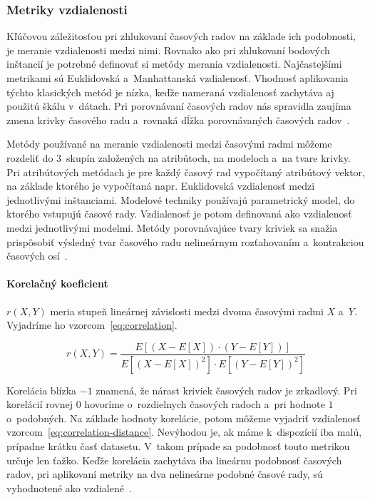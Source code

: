 \documentclass[a4paper,twoside,slovak,12pt,appendix]{article}
\begin{document}
\subsubsection{Metriky vzdialenosti}
\label{c:distance-metrics}
Kľúčovou záležitosťou pri zhlukovaní časových radov na základe ich podobnosti,
je meranie vzdialenosti medzi nimi. Rovnako ako pri zhlukovaní bodových
inštancií je potrebné definovať si metódy merania vzdialenosti. Najčastejšími
metrikami sú Euklidovská a~Manhattanská vzdialenosť. Vhodnosť aplikovania
týchto klasických metód je nízka, keďže nameraná vzdialenosť zachytáva aj
použitú škálu v~dátach. Pri porovnávaní časových radov nás spravidla zaujíma
zmena krivky časového radu a~rovnaká dĺžka porovnávaných časových
radov~\cite{Dzeroski2007,WarrenLiao2005}.

Metódy používané na meranie vzdialenosti medzi časovými radmi môžeme rozdeliť do
3~skupín založených na atribútoch, na modeloch a~na tvare krivky. Pri
atribútových metódach je pre každý časový rad vypočítaný atribútový vektor, na
základe ktorého je vypočítaná napr. Euklidovská vzdialenosť medzi jednotlivými
inštanciami. Modelové techniky používajú parametrický model, do ktorého vstupujú
časové rady. Vzdialenosť je potom definovaná ako vzdialenosť medzi jednotlivými
modelmi. Metódy porovnávajúce tvary kriviek sa snažia prispôsobiť výsledný tvar
časového radu nelineárnym rozťahovaním a~kontrakciou časových
osí~\cite{Hautamaki2008}.


\paragraph{Korelačný koeficient} $r(X, Y)$ meria stupeň lineárnej závislosti
medzi dvoma časovými radmi $X$ a~$Y$. Vyjadríme ho vzorcom~\ref{eq:correlation}.

\begin{equation}
	\label{eq:correlation}
  r \left( X, Y \right) = \frac
  {E \left[ \left( X - E \left[ X \right] \right) \cdot \left( Y - E \left[ Y \right] \right) \right]}
  {E \left[ \left( X - E \left[ X \right] \right)^2 \right] \cdot E \left[ \left( Y - E \left[ Y \right] \right)^2 \right]}
\end{equation}
\medskip

\noindent
Korelácia blízka $-1$ znamená, že nárast kriviek časových radov je zrkadlový.
Pri korelácií rovnej $0$ hovoríme o~rozdielnych časových radoch a~pri hodnote
$1$ o~podobných. Na základe hodnoty korelácie, potom môžeme vyjadriť vzdialenosť
vzorcom~\ref{eq:correlation-distance}. Nevýhodou je, ak máme k~dispozícií iba
malú, prípadne krátku časť datasetu. V~takom prípade sa podobnosť touto metrikou
určuje len ťažko. Keďže korelácia zachytáva iba lineárnu podobnosť časových
radov, pri aplikovaní metriky na dva nelineárne podobné časové rady, sú
vyhodnotené ako vzdialené~\cite{Dzeroski2007}.
\end{document}
